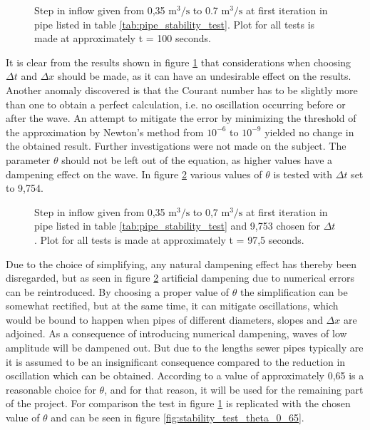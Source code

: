 \begin{figure}[H]
 \centering
 
\caption{Step in inflow given from 0,35 $\text{m}^\text{3}/ \text{s}$ to 0.7 $\text{m}^\text{3}/ \text{s}$ at first iteration in pipe listed in table \ref{tab:pipe_stability_test}. Plot for all tests is made at approximately t = 100 seconds.}
\label{fig:stability_test_theta_0_5}
\end{figure}

It is clear from the results shown in figure \ref{fig:stability_test_theta_0_5} that considerations when choosing $\Delta t$ and $\Delta x$ should be made, as it can have an undesirable effect on the results. Another anomaly discovered is that the Courant number has to be slightly more than one to obtain a perfect calculation, i.e. no oscillation occurring before or after the wave. An attempt to mitigate the error by minimizing the threshold of the approximation by Newton's method from $10^{-6}$ to $10^{-9}$ yielded no change in the obtained result. Further investigations were not made on the subject.
The parameter $\theta$ should not be left out of the equation, as higher values have a dampening effect on the wave. In figure \ref{fig:stability_theta_test_05_065_1} various values of $\theta$ is tested  with $\Delta t$ set to 9,754.    

\begin{figure}[H]
 \centering
 
\caption{Step in inflow given from 0,35 $\text{m}^\text{3}/ \text{s}$ to 0,7 $\text{m}^\text{3}/ \text{s}$ at first iteration in pipe listed in table \ref{tab:pipe_stability_test} and 9,753 chosen for $\Delta t$. Plot for all tests is made at approximately t = 97,5 seconds.}
\label{fig:stability_theta_test_05_065_1}
\end{figure}

Due to the choice of simplifying, any natural dampening effect has thereby been disregarded, but as seen in figure \ref{fig:stability_theta_test_05_065_1} artificial dampening due to numerical errors can be reintroduced. By choosing a proper value of $\theta$ the simplification can be somewhat rectified, but at the same time, it can mitigate oscillations, which would be bound to happen when pipes of different diameters, slopes and $\Delta x$ are adjoined. As a consequence of introducing numerical dampening, waves of low amplitude will be dampened out. But due to the lengths sewer pipes typically are it is assumed to be an insignificant consequence compared to the reduction in oscillation which can be obtained. According to \cite{cunge1980practical} a value of approximately 0,65 is a reasonable choice for $\theta$, and for that reason, it will be used for the remaining part of the project. For comparison the test in figure \ref{fig:stability_test_theta_0_5} is replicated with the chosen value of $\theta$ and can be seen in figure \ref{fig:stability_test_theta_0_65}.

